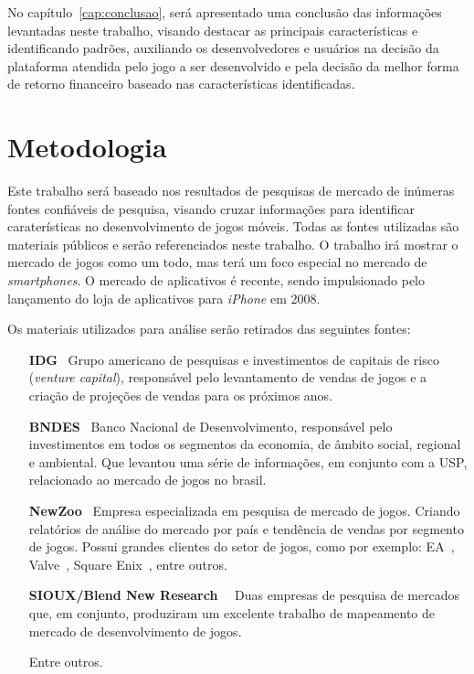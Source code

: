 No capítulo~\ref{cap:conclusao}, será apresentado uma conclusão das informações levantadas neste trabalho, visando destacar as principais características e identificando padrões, auxiliando os desenvolvedores e usuários na decisão da plataforma atendida pelo jogo a ser desenvolvido e pela decisão da melhor forma de retorno financeiro baseado nas características identificadas.



\section{Metodologia}

Este trabalho será baseado nos resultados de pesquisas de mercado de inúmeras fontes confiáveis de pesquisa, visando cruzar informações para identificar caraterísticas no desenvolvimento de jogos móveis. Todas as fontes utilizadas são materiais públicos e serão referenciados neste trabalho.\newline
O trabalho irá mostrar o mercado de jogos como um todo, mas terá um foco especial no mercado de \emph{smartphones}. O mercado de aplicativos é recente, sendo impulsionado pelo lançamento do loja de aplicativos para \emph{iPhone} em 2008.



Os materiais utilizados para análise serão retirados das seguintes fontes:


\begin{itemize}

	\item [\textbf{IDG}~\cite{idg}] Grupo americano de pesquisas e investimentos de capitais de risco (\emph{venture capital}), responsável pelo levantamento de vendas de jogos e a criação de projeções de vendas para os próximos anos.

	\item [\textbf{BNDES}~\cite{bndes}] Banco Nacional de Desenvolvimento, responsável pelo investimentos em todos os segmentos da economia, de âmbito social, regional e ambiental. Que levantou uma série de informações, em conjunto com a USP, relacionado ao mercado de jogos no brasil.
	
	\item [\textbf{NewZoo}~\cite{newzoo}] Empresa especializada em pesquisa de mercado de jogos. Criando relatórios de análise do mercado por país e tendência de vendas por segmento de jogos. Possui grandes clientes do setor de jogos, como por exemplo: EA~\cite{ea}, Valve~\cite{valve}, Square Enix~\cite{square-enix}, entre outros.
	
	
	\item[\textbf{SIOUX/Blend New Research}~\cite{sioux}~\cite{blend}] Duas empresas de pesquisa de mercados que, em conjunto, produziram um excelente trabalho de mapeamento de mercado de desenvolvimento de jogos.
	
	\item [Entre outros.]

\end{itemize}





